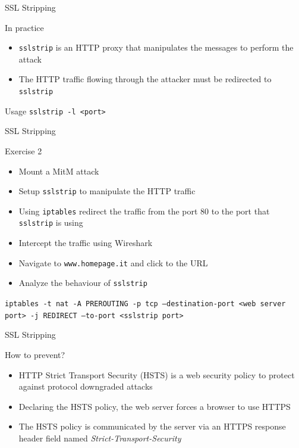 \documentclass{beamer}
\begin{document}
\begin{frame}{SSL Stripping}
  \begin{block}{In practice}
    \begin{itemize}
      \item \texttt{sslstrip} is an HTTP proxy that manipulates the messages to perform the attack
      \item The HTTP traffic flowing through the attacker must be redirected to \texttt{sslstrip}
    \end{itemize}
  \end{block}
  \begin{block}{Usage}
  \texttt{sslstrip -l <port>}
  \end{block}
\end{frame}
\begin{frame}{SSL Stripping}
  \begin{block}{Exercise 2}
    \begin{itemize}
      \item Mount a MitM attack
      \item Setup \texttt{sslstrip} to manipulate the HTTP traffic
      \item Using \texttt{iptables} redirect the traffic from the port 80 to the port that \texttt{sslstrip} is using
      \item Intercept the traffic using Wireshark
      \item Navigate to \texttt{www.homepage.it} and click to the URL
      \item Analyze the behaviour of \texttt{sslstrip}
    \end{itemize}
  \end{block}
  \pause
  \texttt{iptables -t nat -A PREROUTING -p tcp --destination-port <web server port> -j REDIRECT --to-port <sslstrip port>}

\end{frame}
\begin{frame}{SSL Stripping}
  \begin{block}{How to prevent?}
  \pause
  \begin{itemize}
      \item HTTP Strict Transport Security (HSTS) is a web security policy to protect against protocol downgraded attacks
      \item Declaring the HSTS policy, the web server forces a browser to use HTTPS
      \item The HSTS policy is communicated by the server via an HTTPS response header field named \textit{Strict-Transport-Security}
    \end{itemize}
  \end{block}
  \pause
\end{frame}
\end{document}
